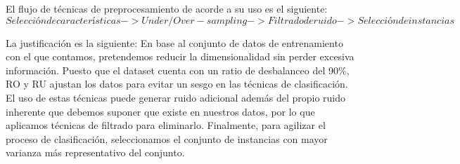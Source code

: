 El flujo de técnicas de preprocesamiento de acorde a su uso es el siguiente:
\begin{equation}
    Selección de características -> Under/Over-sampling -> Filtrado de ruido -> Selección de instancias
\end{equation}

La justificación es la siguiente: En base al conjunto de datos de entrenamiento con el que contamos, pretendemos reducir la dimensionalidad sin perder excesiva información. Puesto que el dataset cuenta con un ratio de desbalanceo del 90\%, RO y RU ajustan los datos para evitar un sesgo en las técnicas de clasificación. El uso de estas técnicas puede generar ruido adicional además del propio ruido inherente que debemos suponer que existe en nuestros datos, por lo que aplicamos técnicas de filtrado para eliminarlo. Finalmente, para agilizar el proceso de clasificación, seleccionamos el conjunto de instancias con mayor varianza más representativo del conjunto.








